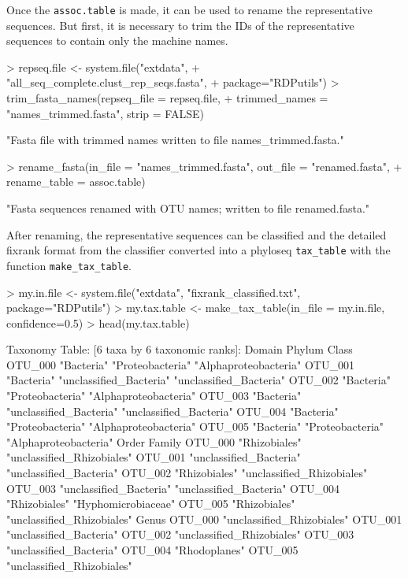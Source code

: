 \documentclass{article}
\begin{document}
Once the \texttt{assoc.table} is made, it can be used to rename the representative sequences.  But first, it is necessary to trim the IDs of the representative sequences to contain only the machine names.
\begin{Schunk}
\begin{Sinput}
> repseq.file <- system.file("extdata", 
+                            "all_seq_complete.clust_rep_seqs.fasta", 
+                            package="RDPutils")
> trim_fasta_names(repseq_file = repseq.file, 
+                  trimmed_names = "names_trimmed.fasta", strip = FALSE)
\end{Sinput}
\begin{Soutput}
[1] "Fasta file with trimmed names written to file names_trimmed.fasta."
\end{Soutput}
\begin{Sinput}
> rename_fasta(in_file = "names_trimmed.fasta", out_file = "renamed.fasta", 
+              rename_table = assoc.table)
\end{Sinput}
\begin{Soutput}
[1] "Fasta sequences renamed with OTU names; written to file renamed.fasta."
\end{Soutput}
\end{Schunk}
After renaming, the representative sequences can be classified and the detailed fixrank format from the classifier converted into a phyloseq \texttt{tax\_table} with the function \texttt{make\_tax\_table}.
\begin{Schunk}
\begin{Sinput}
> my.in.file <- system.file("extdata", "fixrank_classified.txt", package="RDPutils")
> my.tax.table <- make_tax_table(in_file = my.in.file, confidence=0.5)
> head(my.tax.table)
\end{Sinput}
\begin{Soutput}
Taxonomy Table:     [6 taxa by 6 taxonomic ranks]:
        Domain     Phylum                  Class                  
OTU_000 "Bacteria" "Proteobacteria"        "Alphaproteobacteria"  
OTU_001 "Bacteria" "unclassified_Bacteria" "unclassified_Bacteria"
OTU_002 "Bacteria" "Proteobacteria"        "Alphaproteobacteria"  
OTU_003 "Bacteria" "unclassified_Bacteria" "unclassified_Bacteria"
OTU_004 "Bacteria" "Proteobacteria"        "Alphaproteobacteria"  
OTU_005 "Bacteria" "Proteobacteria"        "Alphaproteobacteria"  
        Order                   Family                    
OTU_000 "Rhizobiales"           "unclassified_Rhizobiales"
OTU_001 "unclassified_Bacteria" "unclassified_Bacteria"   
OTU_002 "Rhizobiales"           "unclassified_Rhizobiales"
OTU_003 "unclassified_Bacteria" "unclassified_Bacteria"   
OTU_004 "Rhizobiales"           "Hyphomicrobiaceae"       
OTU_005 "Rhizobiales"           "unclassified_Rhizobiales"
        Genus                     
OTU_000 "unclassified_Rhizobiales"
OTU_001 "unclassified_Bacteria"   
OTU_002 "unclassified_Rhizobiales"
OTU_003 "unclassified_Bacteria"   
OTU_004 "Rhodoplanes"             
OTU_005 "unclassified_Rhizobiales"
\end{Soutput}
\end{Schunk}
\end{document}
